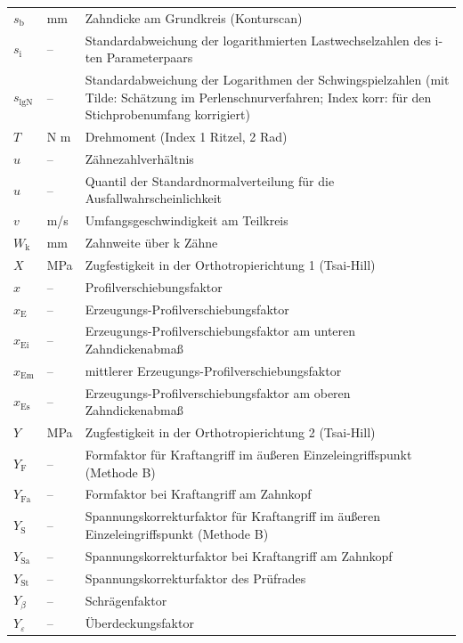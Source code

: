 \begin{longtable}{llL{0.66\textwidth}}
    $s_{\mathrm{b}}$ & mm & Zahndicke am Grundkreis (Konturscan) \\
    $s_{\mathrm{i}}$ & -- & Standardabweichung der logarithmierten Lastwechselzahlen des i-ten Parameterpaars \\
    $s_{\mathrm{lgN}}$ & -- & Standardabweichung der Logarithmen der Schwingspielzahlen (mit Tilde: Schätzung im Perlenschnurverfahren; Index korr: für den Stichprobenumfang korrigiert) \\
    $T$ & N m & Drehmoment (Index 1 Ritzel, 2 Rad) \\
    $u$ & -- & Zähnezahlverhältnis \\
    $u$ & -- & Quantil der Standardnormalverteilung für die Ausfallwahrscheinlichkeit \\
    $v$ & m/s & Umfangsgeschwindigkeit am Teilkreis \\
    $W_{\mathrm{k}}$ & mm & Zahnweite über k Zähne \\
    $X$ & MPa & Zugfestigkeit in der Orthotropierichtung 1 (Tsai-Hill) \\
    $x$ & -- & Profilverschiebungsfaktor \\
    $x_{\mathrm{E}}$ & -- & Erzeugungs-Profilverschiebungsfaktor \\
    $x_{\mathrm{Ei}}$ & -- & Erzeugungs-Profilverschiebungsfaktor am unteren Zahndickenabmaß \\
    $x_{\mathrm{Em}}$ & -- & mittlerer Erzeugungs-Profilverschiebungsfaktor \\
    $x_{\mathrm{Es}}$ & -- & Erzeugungs-Profilverschiebungsfaktor am oberen Zahndickenabmaß \\
    $Y$ & MPa & Zugfestigkeit in der Orthotropierichtung 2 (Tsai-Hill) \\
    $Y_{\mathrm{F}}$ & -- & Formfaktor für Kraftangriff im äußeren Einzeleingriffspunkt (Methode B) \\
    $Y_{\mathrm{Fa}}$ & -- & Formfaktor bei Kraftangriff am Zahnkopf \\
    $Y_{\mathrm{S}}$ & -- & Spannungskorrekturfaktor für Kraftangriff im äußeren Einzeleingriffspunkt (Methode B) \\
    $Y_{\mathrm{Sa}}$ & -- & Spannungskorrekturfaktor bei Kraftangriff am Zahnkopf \\
    $Y_{\mathrm{St}}$ & -- & Spannungskorrekturfaktor des Prüfrades \\
    $Y_{\beta}$ & -- & Schrägenfaktor \\
    $Y_{\varepsilon}$ & -- & Überdeckungsfaktor \\

\end{longtable}
